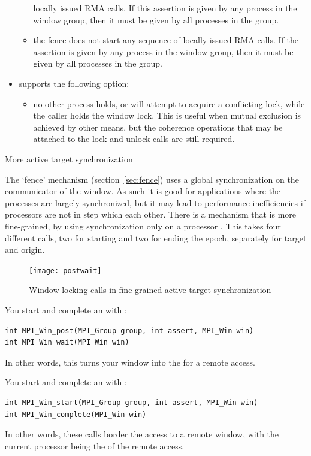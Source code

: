 \begin{itemize}
\begin{itemize}
    locally issued RMA calls. If this assertion is given by any
    process in the window group, then it must be given by all
    processes in the group.
  \item[\indexmpishow{MPI_MODE_NOSUCCEED}] the fence does not start any
    sequence of locally issued RMA calls. If the assertion is given by
    any process in the window group, then it must be given by all
    processes in the group.
  \end{itemize}
\item[\indexmpishow{MPI_Win_lock}] supports the following option:
  \begin{itemize}
    \item[\indexmpishow{MPI_MODE_NOCHECK}] no other process holds, or will attempt to
    acquire a conflicting lock, while the caller holds the window
    lock. This is useful when mutual exclusion is achieved by other
    means, but the coherence operations that may be attached to the
    lock and unlock calls are still required.
  \end{itemize}
\end{itemize}

 {More active target synchronization}
\label{sec:ref:post-wait}

The `fence' mechanism (section~\ref{sec:fence}) uses a global synchronization on the
communicator of the window. As such it is good for applications where
the processes are largely synchronized, but it may 
lead to performance inefficiencies if processors are not in step which each other. 
There is a mechanism that is more fine-grained, by using synchronization only 
on a processor . This takes four different calls, two for starting
and two for ending the epoch, separately for target and origin.
\begin{figure}[ht]
  \texttt{[image: postwait]}
  \caption{Window locking calls in fine-grained active target synchronization}
  \label{fig:postwait}
\end{figure}

You start and complete an  with%
:
\begin{lstlisting}
int MPI_Win_post(MPI_Group group, int assert, MPI_Win win)
int MPI_Win_wait(MPI_Win win)
\end{lstlisting}
In other words, this turns your window into the  for a remote access.

You start and complete an  with%
:
\begin{lstlisting}
int MPI_Win_start(MPI_Group group, int assert, MPI_Win win)
int MPI_Win_complete(MPI_Win win)
\end{lstlisting}
In other words, these calls border the access to a remote window, with the current processor
being the  of the remote access.

